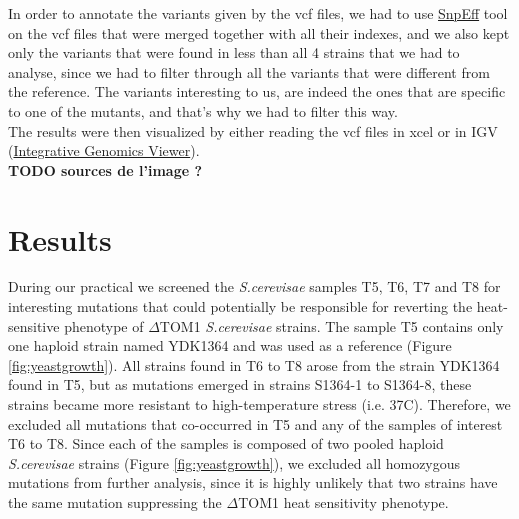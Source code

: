 \documentclass[10pt,a4paper]{article}
\begin{document}
\noindent In order to annotate the variants given by the vcf files, we had to use \href{http://snpeff.sourceforge.net/}{SnpEff} tool on the vcf files that were merged together with all their indexes, and we also kept only the variants that were found in less than all 4 strains that we had to analyse, since we had to filter through all the variants that were different from the reference. The variants interesting to us, are indeed the ones that are specific to one of the mutants, and that’s why we had to filter this way.\\

\noindent The results were then visualized by either reading the vcf files in xcel or in IGV (\href{http://software.broadinstitute.org/software/igv/}{Integrative Genomics Viewer}).\\


\textbf{TODO sources de l'image ?}

\section*{Results}
During our practical we screened the \textit{S.cerevisae} samples T5, T6, T7 and T8 for interesting mutations that could potentially be responsible for reverting the heat-sensitive phenotype of $\Delta$TOM1 \textit{S.cerevisae} strains. The sample T5 contains only one haploid strain named YDK1364 and was used as a reference (Figure \ref{fig:yeastgrowth}). All strains found in T6 to T8 arose from the strain YDK1364 found in T5, but as mutations emerged in strains S1364-1 to S1364-8, these strains became more resistant to high-temperature stress (i.e. 37\degree C). Therefore, we excluded all mutations that co-occurred in T5 and any of the samples of interest T6 to T8. Since each of the samples is composed of two pooled haploid \textit{S.cerevisae} strains (Figure \ref{fig:yeastgrowth}), we excluded all homozygous mutations from further analysis, since it is highly unlikely that two strains have the same mutation suppressing the $\Delta$TOM1 heat sensitivity phenotype.
\end{document}
